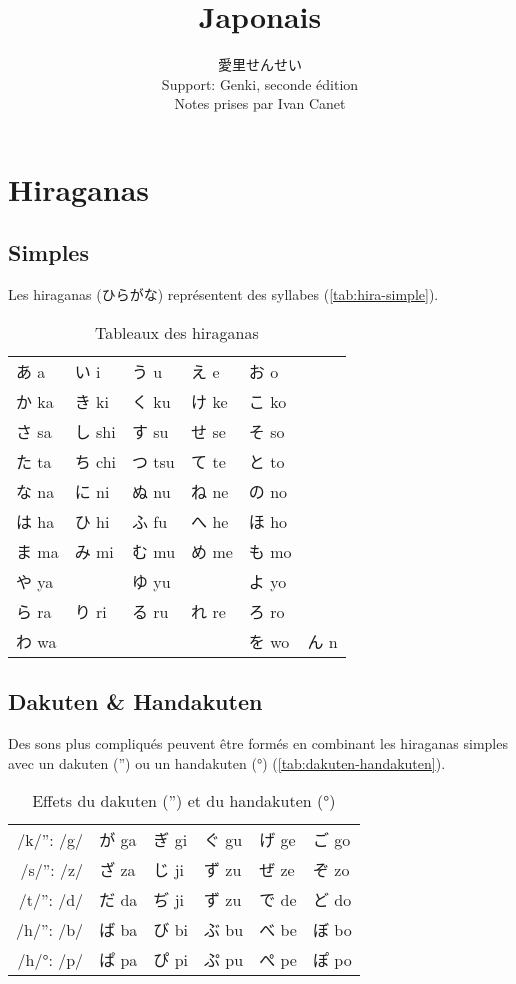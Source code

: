 \documentclass[a4paper,10pt,french,openany]{memoir}
\title{Japonais}
\author{愛里せんせい\\Support: Genki, seconde édition\\Notes prises par Ivan Canet}%
\begin{document}
\maketitle
\tableofcontents

\chapter{Hiraganas}
\section{Simples}

Les hiraganas (ひらがな) représentent des syllabes (\autoref{tab:hira-simple}).

\begin{table}[htbp]
 \centering
 \begin{tabular}{llllll}
  あ a  & い i  & う u  & え e  & お o  &\\
  か ka & き ki & く ku & け ke & こ ko &\\
  さ sa & し shi& す su & せ se & そ so &\\
  た ta & ち chi& つ tsu& て te & と to &\\
  な na & に ni & ぬ nu & ね ne & の no &\\
  は ha & ひ hi & ふ fu & へ he & ほ ho &\\
  ま ma & み mi & む mu & め me & も mo &\\
  や ya & 　    & ゆ yu &　     & よ yo &\\
  ら ra & り ri & る ru & れ re & ろ ro &\\
  わ wa & 　    & 　    & 　    & を wo & ん n\\
 \end{tabular}
 \caption{Tableaux des hiraganas}
 \label{tab:hira-simple}
\end{table}

\section{Dakuten \& Handakuten}

Des sons plus compliqués peuvent être formés en combinant les hiraganas simples avec un dakuten ('') ou un handakuten (°) (\autoref{tab:dakuten-handakuten}).

\begin{table}[htbp]
 \centering
 \begin{tabular}{r|lllll}
  /k/'': /g/ & が ga & ぎ gi & ぐ gu & げ ge & ご go \\
  /s/'': /z/ & ざ za & じ ji & ず zu & ぜ ze & ぞ zo \\
  /t/'': /d/ & だ da & ぢ ji & ず zu & で de & ど do \\
  /h/'': /b/ & ば ba & び bi & ぶ bu & べ be & ぼ bo \\
  /h/°: /p/  & ぱ pa & ぴ pi & ぷ pu & ぺ pe & ぽ po \\
 \end{tabular}
 \caption{Effets du dakuten ('') et du handakuten (°)}
 \label{tab:dakuten-handakuten}
\end{table}
\end{document}
